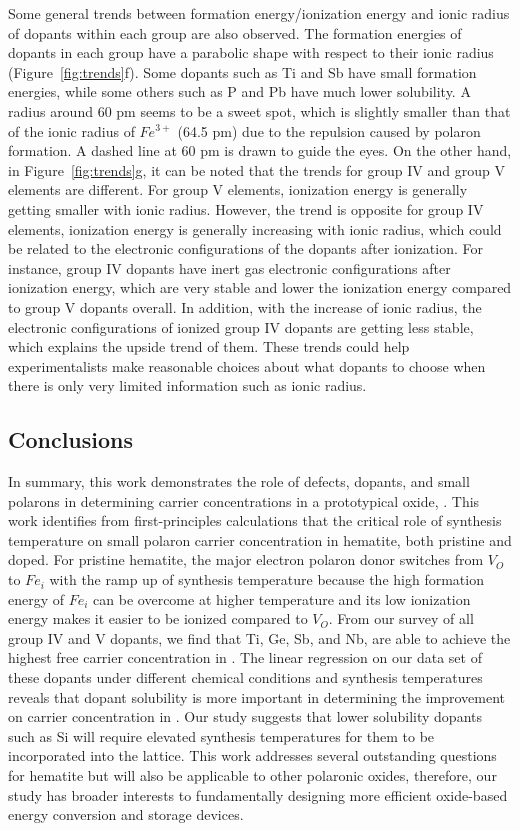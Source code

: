  Some general trends between formation energy/ionization energy and ionic radius of dopants within each group are also observed. The formation energies of dopants in each group have a parabolic shape with respect to their ionic radius (Figure~\ref{fig:trends}f). Some dopants such as Ti and Sb have small formation energies, while some others such as P and Pb have much lower solubility. A radius around 60 pm seems to be a sweet spot, which is slightly smaller than that of the ionic radius of $Fe^{3+}$ (64.5 pm) due to the repulsion caused by polaron formation. A dashed line at 60 pm is drawn to guide the eyes. On the other hand, in Figure~\ref{fig:trends}g, it can be noted that the trends for group IV and group V elements are different. For group V elements, ionization energy is generally getting smaller with ionic radius. However, the trend is opposite for group IV elements, ionization energy is generally increasing with ionic radius, which could be related to the electronic configurations of the dopants after ionization. For instance, group IV dopants have inert gas electronic configurations after ionization energy, which are very stable and lower the ionization energy compared to group V dopants overall. In addition, with the increase of ionic radius, the electronic configurations of ionized group IV dopants are getting less stable, which explains the upside trend of them.
 These trends could help experimentalists make reasonable choices about what dopants to choose when there is only very limited information such as ionic radius.

\subsection{Conclusions}

 In summary, this work demonstrates the role of defects, dopants, and small polarons in determining carrier concentrations in a prototypical oxide, . This work identifies from first-principles calculations that the critical role of synthesis temperature on small polaron carrier concentration in hematite, both pristine and doped. For pristine hematite, the major electron polaron donor switches from $V_O$ to $Fe_i$ with the ramp up of synthesis temperature because the high formation energy of $Fe_i$ can be overcome at higher temperature and its low ionization energy makes it easier to be ionized compared to $V_O$. From our survey of all group IV and V dopants, we find that Ti, Ge, Sb, and Nb, are able to achieve the highest free carrier concentration in .
 The linear regression on our data set of these dopants under different chemical conditions and synthesis temperatures reveals that dopant solubility is more important in determining the improvement on carrier concentration in .
 Our study suggests that lower solubility dopants such as Si will require elevated synthesis temperatures for them to be incorporated into the lattice.
 This work addresses several outstanding questions for hematite but will also be applicable to other polaronic oxides, therefore, our study has broader interests to fundamentally designing more efficient oxide-based energy conversion and storage devices.
